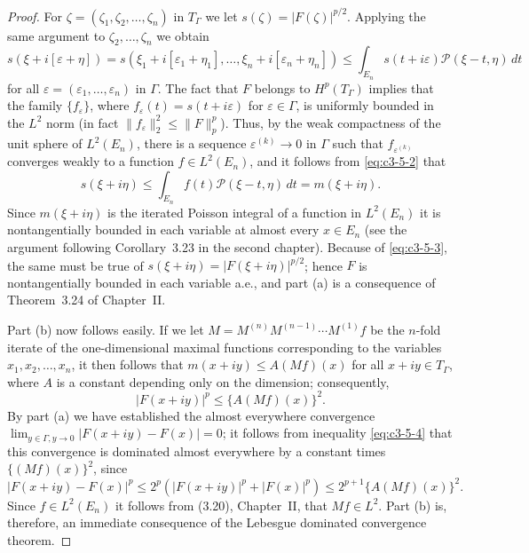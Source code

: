 \begin{proof}
For $\zeta = (\zeta_1, \zeta_2, \dots, \zeta_n)$ in $T_\Gamma$ we let $s(\zeta) = |F(\zeta)|^{p/2}$. Applying the same argument to $\zeta_2, \dots, \zeta_n$ we obtain
\begin{equation}\label{eq:c3-5-2}
s(\xi + i[\varepsilon + \eta]) = s(\xi_1 + i[\varepsilon_1 + \eta_1], \dots, \xi_n + i[\varepsilon_n + \eta_n]) \leq \int_{E_n} s(t + i\varepsilon) \mathcal{P}(\xi - t, \eta)\,dt
\end{equation}
for all $\varepsilon = (\varepsilon_1, \dots, \varepsilon_n)$ in $\Gamma$. The fact that $F$ belongs to $H^p(T_\Gamma)$ implies that the family $\{f_\varepsilon\}$, where $f_\varepsilon(t) = s(t + i\varepsilon)$ for $\varepsilon \in \Gamma$, is uniformly bounded in the $L^2$ norm (in fact $\|f_\varepsilon\|_2^2 \leq \|F\|_p^p$). Thus, by the weak compactness of the unit sphere of $L^2(E_n)$, there is a sequence $\varepsilon^{(k)} \to 0$ in $\Gamma$ such that $f_{\varepsilon^{(k)}}$ converges weakly to a function $f \in L^2(E_n)$, and it follows from \eqref{eq:c3-5-2} that
\begin{equation}\label{eq:c3-5-3}
s(\xi + i\eta) \leq \int_{E_n} f(t) \mathcal{P}(\xi - t, \eta)\,dt = m(\xi + i\eta).
\end{equation}
Since $m(\xi + i\eta)$ is the iterated Poisson integral of a function in $L^2(E_n)$ it is nontangentially bounded in each variable at almost every $x \in E_n$ (see the argument following Corollary~3.23 in the second chapter). Because of \eqref{eq:c3-5-3}, the same must be true of $s(\xi + i\eta) = |F(\xi + i\eta)|^{p/2}$; hence $F$ is nontangentially bounded in each variable a.e., and part (a) is a consequence of Theorem~3.24 of Chapter~II.

Part (b) now follows easily. If we let $M = M^{(n)} M^{(n-1)} \cdots M^{(1)} f$ be the $n$-fold iterate of the one-dimensional maximal functions corresponding to the variables $x_1, x_2, \dots, x_n$, it then follows that $m(x + iy) \leq A(Mf)(x)$ for all $x + iy \in T_\Gamma$, where $A$ is a constant depending only on the dimension; consequently,
\begin{equation}\label{eq:c3-5-4}
|F(x + iy)|^p \leq \{A(Mf)(x)\}^2.
\end{equation}
By part (a) we have established the almost everywhere convergence $\lim_{y \in \Gamma, y \to 0} |F(x + iy) - F(x)| = 0$; it follows from inequality \eqref{eq:c3-5-4} that this convergence is dominated almost everywhere by a constant times $\{(Mf)(x)\}^2$, since
\[
|F(x + iy) - F(x)|^p \leq 2^p (|F(x + iy)|^p + |F(x)|^p) \leq 2^{p+1}\{A(Mf)(x)\}^2.
\]
Since $f \in L^2(E_n)$ it follows from (3.20), Chapter~II, that $Mf \in L^2$. Part (b) is, therefore, an immediate consequence of the Lebesgue dominated convergence theorem.
\end{proof}

